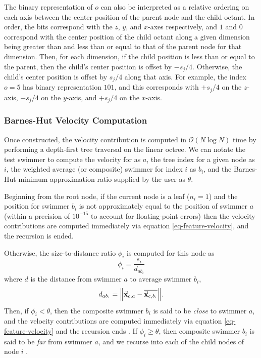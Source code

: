 \documentclass[letterpaper, 10pt, twoside]{LTJournalArticle}
\renewcommand{\O}{\mathcal{O}}
\begin{document}
The binary representation of $o$ can also be interpreted as a relative ordering
on each axis between the center position of the parent node and the child
octant. In order, the bits correspond with the $z$, $y$, and $x$-axes
respectively, and $1$ and $0$ correspond with the center position of the child
octant along a given dimension being greater than and less than or equal to that
of the parent node for that dimension. Then, for each dimension, if the child
position is less than or equal to the parent, then the child's center position
is offset by $-s_j/4$. Otherwise, the child's center position is offset by
$s_j/4$ along that axis. For example, the index $o=5$ has binary representation
$101$, and this corresponds with $+s_j/4$ on the $z$-axis, $-s_j/4$ on the
$y$-axis, and $+s_j/4$ on the $x$-axis.

\subsubsection{Barnes-Hut Velocity Computation}
\label{subsubsection-barnes-hut-velocity-comp}

Once constructed, the velocity contribution is computed in $\O(N \log N)$ time
by performing a depth-first tree traversal on the linear octree. We can notate
the test swimmer to compute the velocity for as $a$, the tree index for a given
node as $i$, the weighted average (or composite) swimmer for index $i$ as $b_i$,
and the Barnes-Hut minimum approximation ratio supplied by the user as $\theta$.

Beginning from the root node, if the current node is a leaf ($n_i = 1$) and the
position for swimmer $b_i$ is not approximately equal to the position of swimmer
$a$ (within a precision of $10^{-15}$ to account for floating-point errors)
then the velocity contributions are computed immediately via equation
\ref{eq-feature-velocity}, and the recursion is ended.

Otherwise, the size-to-distance ratio $\phi_i$ is computed for this node as
\begin{equation}\label{eq-size-to-distance}
  \phi_i = \frac{s_i}{d_{ab_i}}
\end{equation}
where $d$ is the distance from swimmer $a$ to average swimmer $b_i$,
\begin{equation}\label{eq-bh-distance}
d_{ab_i} = \norm{\va{x}_{c,a} - \overline{\va{x}_{c,b_i}}}.
\end{equation}
Then, if $\phi_i < \theta$, then the composite swimmer $b_i$ is said to be
\textit{close} to swimmer $a$, and the velocity contributions are computed
immediately via equation \ref{eq-feature-velocity} and the recursion ends
\cite{barnes_hut_1986}. If $\phi_i \ge \theta$, then composite swimmer $b_i$
is said to be \textit{far} from swimmer $a$, and we recurse into each of the
child nodes of node $i$ \cite{barnes_hut_1986}.
\end{document}
